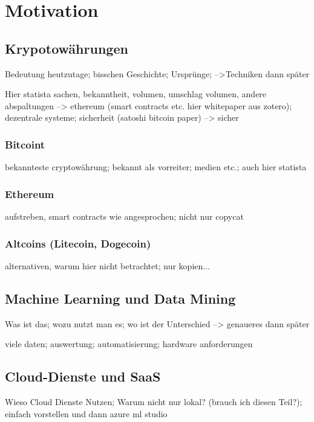\chapter{Motivation}

\section{Krypotowährungen}
Bedeutung heutzutage; bisschen Geschichte; Ursprünge; -->Techniken dann später

Hier statista sachen, bekanntheit, volumen, umschlag volumen, andere abspaltungen --> ethereum (smart contracts etc. hier whitepaper aus zotero);
dezentrale systeme; sicherheit (satoshi bitcoin paper) --> sicher


\subsection{Bitcoint}
bekannteste cryptowährung; bekannt als vorreiter; medien etc.; auch hier statista


\subsection{Ethereum}
aufstreben, smart contracts wie angesprochen; nicht nur copycat


\subsection{Altcoins (Litecoin, Dogecoin)}
alternativen, warum hier nicht betrachtet; nur kopien...




\section{Machine Learning und Data Mining}
Was ist das; wozu nutzt man es; wo ist der Unterschied --> genaueres dann später

viele daten; auswertung; automatisierung; hardware anforderungen


\section{Cloud-Dienste und SaaS}
Wieso Cloud Dienste Nutzen; Warum nicht nur lokal? (brauch ich diesen Teil?); einfach vorstellen und dann azure ml studio